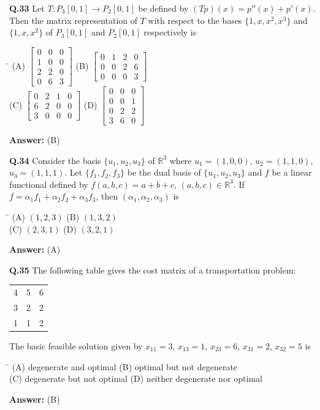 \documentclass[11pt,a4paper]{article}
\newcommand{\optsfourA}[4]{%
  \begin{tabbing}
    \hspace{0.48\linewidth}\=\kill
    (A) #1 \> (B) #2 \\[2pt]
    (C) #3 \> (D) #4
  \end{tabbing}%
}
\newcommand{\ans}[1]{\textbf{Answer:} #1\par\medskip}
\begin{document}
\textbf{Q.33} Let $T : P_3[0, 1] \to P_2[0, 1]$ be defined by $(Tp)(x) = p''(x) + p'(x)$. Then the matrix representation of $T$ with respect to the bases $\{1, x, x^2, x^3\}$ and $\{1, x, x^2\}$ of $P_3[0, 1]$ and $P_2[0, 1]$ respectively is
\optsfourA{$\begin{bmatrix} 0 & 0 & 0 \\ 1 & 0 & 0 \\ 2 & 2 & 0 \\ 0 & 6 & 3 \end{bmatrix}$}{$\begin{bmatrix} 0 & 1 & 2 & 0 \\ 0 & 0 & 2 & 6 \\ 0 & 0 & 0 & 3 \end{bmatrix}$}{$\begin{bmatrix} 0 & 2 & 1 & 0 \\ 6 & 2 & 0 & 0 \\ 3 & 0 & 0 & 0 \end{bmatrix}$}{$\begin{bmatrix} 0 & 0 & 0 \\ 0 & 0 & 1 \\ 0 & 2 & 2 \\ 3 & 6 & 0 \end{bmatrix}$}
\ans{(B)}

\textbf{Q.34} Consider the basis $\{u_1, u_2, u_3\}$ of $\mathbb{R}^3$ where $u_1 = (1, 0, 0)$, $u_2 = (1, 1, 0)$, $u_3 = (1, 1, 1)$. Let $\{f_1, f_2, f_3\}$ be the dual basis of $\{u_1, u_2, u_3\}$ and $f$ be a linear functional defined by $f(a, b, c) = a + b + c$, $(a, b, c) \in \mathbb{R}^3$. If $f = \alpha_1 f_1 + \alpha_2 f_2 + \alpha_3 f_3$, then $(\alpha_1, \alpha_2, \alpha_3)$ is
\optsfourA{$(1, 2, 3)$}{$(1, 3, 2)$}{$(2, 3, 1)$}{$(3, 2, 1)$}
\ans{(A)}

\textbf{Q.35} The following table gives the cost matrix of a transportation problem:
\begin{center}
\begin{tabular}{ccc}
  \toprule
  4 & 5 & 6 \\
  3 & 2 & 2 \\
  1 & 1 & 2 \\
  \bottomrule
\end{tabular}
\end{center}
The basic feasible solution given by $x_{11} = 3$, $x_{13} = 1$, $x_{23} = 6$, $x_{31} = 2$, $x_{32} = 5$ is
\optsfourA{degenerate and optimal}{optimal but not degenerate}{degenerate but not optimal}{neither degenerate nor optimal}
\ans{(B)}
\end{document}
